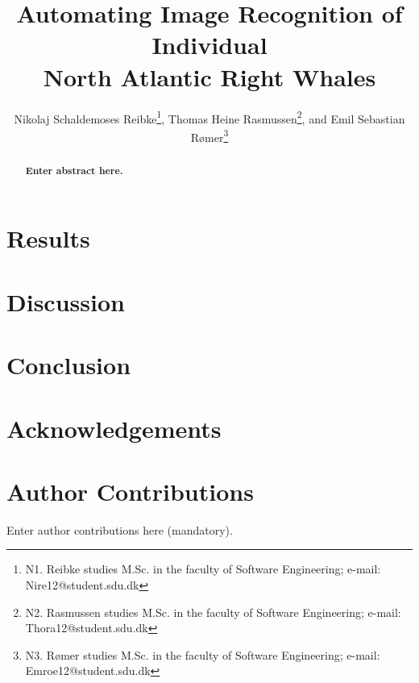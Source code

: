 \documentclass[10pt,a4paper,twocolumn]{article}
\begin{document}
\title{\textbf{Automating Image Recognition of Individual \\ North Atlantic Right Whales}}

\author{Nikolaj Schaldemoses Reibke\thanks{N1. Reibke studies M.Sc. in the faculty of Software Engineering; e-mail: Nire12@student.sdu.dk},
		Thomas Heine Rasmussen\thanks{N2. Rasmussen studies M.Sc. in the faculty of Software Engineering; e-mail: Thora12@student.sdu.dk},
        and Emil Sebastian R{\o}mer\thanks{N3. R{\o}mer studies M.Sc. in the faculty of Software Engineering; e-mail: Emroe12@student.sdu.dk}
}

\maketitle

\begin{abstract}
\textbf{Enter abstract here.}
\end{abstract}





\section{Results}


\section{Discussion}


\section{Conclusion}


\section*{Acknowledgements}

%



\appendix
\section{Author Contributions}
Enter author contributions here (mandatory).
\end{document}
